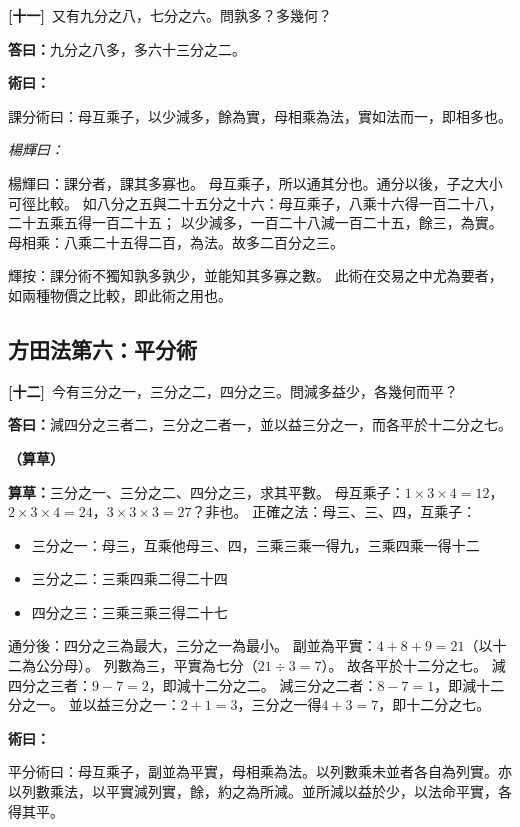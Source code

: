 \documentclass[11pt,a4paper]{article}
\newenvironment{method}{%
  \par\noindent\textcolor{methodcolor}{\textbf{術曰：}}%
  \ignorespaces
}{\par\vspace{0.5em}}
\newenvironment{caocao}{%
  \par\noindent\textcolor{caocaocolor}{\small\textbf{（算草）}}%
  \ignorespaces
}{\par\vspace{0.5em}}
\newenvironment{yanghuicomment}{%
  \par\noindent\textcolor{commentarycolor}{\small\textit{楊輝曰：}}%
  \ignorespaces
}{\par\vspace{0.5em}}
\newcommand{\problemnum}[1]{\textbf{[\ignorespaces#1\unskip]}}
\begin{document}
\noindent\problemnum{十一}\,
又有九分之八，七分之六。問孰多？多幾何？

\noindent\textcolor{answercolor}{\textbf{答曰：}}九分之八多，多六十三分之二。

\begin{method}
課分術曰：母互乘子，以少減多，餘為實，母相乘為法，實如法而一，即相多也。
\end{method}

\begin{yanghuicomment}
楊輝曰：課分者，課其多寡也。
母互乘子，所以通其分也。通分以後，子之大小可徑比較。
如八分之五與二十五分之十六：母互乘子，八乘十六得一百二十八，二十五乘五得一百二十五；
以少減多，一百二十八減一百二十五，餘三，為實。
母相乘：八乘二十五得二百，為法。故多二百分之三。

輝按：課分術不獨知孰多孰少，並能知其多寡之數。
此術在交易之中尤為要者，如兩種物價之比較，即此術之用也。
\end{yanghuicomment}

\subsection{方田法第六：平分術}

\noindent\problemnum{十二}\,
今有三分之一，三分之二，四分之三。問減多益少，各幾何而平？

\noindent\textcolor{answercolor}{\textbf{答曰：}}減四分之三者二，三分之二者一，並以益三分之一，而各平於十二分之七。

\begin{caocao}
\textbf{算草：}三分之一、三分之二、四分之三，求其平數。
母互乘子：$1 \times 3 \times 4 = 12$，$2 \times 3 \times 4 = 24$，$3 \times 3 \times 3 = 27$？非也。
正確之法：母三、三、四，互乘子：
\begin{itemize}[leftmargin=3em]
\item 三分之一：母三，互乘他母三、四，三乘三乘一得九，三乘四乘一得十二
\item 三分之二：三乘四乘二得二十四
\item 四分之三：三乘三乘三得二十七
\end{itemize}
通分後：四分之三為最大，三分之一為最小。
副並為平實：$4 + 8 + 9 = 21$（以十二為公分母）。
列數為三，平實為七分（$21 \div 3 = 7$）。
故各平於十二分之七。
減四分之三者：$9 - 7 = 2$，即減十二分之二。
減三分之二者：$8 - 7 = 1$，即減十二分之一。
並以益三分之一：$2 + 1 = 3$，三分之一得$4 + 3 = 7$，即十二分之七。
\end{caocao}

\begin{method}
平分術曰：母互乘子，副並為平實，母相乘為法。以列數乘未並者各自為列實。亦以列數乘法，以平實減列實，餘，約之為所減。並所減以益於少，以法命平實，各得其平。
\end{method}
\end{document}
